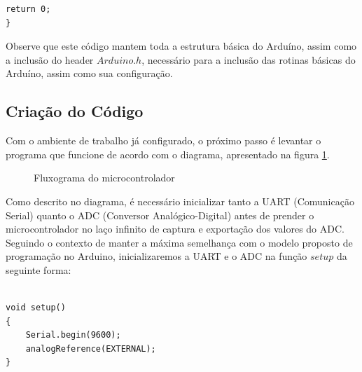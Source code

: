 \begin{multicols}{2}
\begin{lstlisting}[basicstyle=\ttfamily,numbers=none,caption={[Exemplo da função main()]Código de exemplo da função main()}]
	return 0;
}
\end{lstlisting}

Observe que este código mantem toda a estrutura básica do Arduíno, assim como a inclusão do header $Arduino.h$, necessário para a inclusão das rotinas básicas do Arduíno, assim como sua configuração.

\subsection{Criação do Código}\label{making}

Com o ambiente de trabalho já configurado, o próximo passo é levantar o programa que funcione de acordo com o diagrama, apresentado na figura \ref{flux_micro}.

\begin{figure}[H]
\begin{center}
\end{center}
\caption{Fluxograma do microcontrolador}
\label{flux_micro}
\end{figure}

Como descrito no diagrama, é necessário inicializar tanto a UART (Comunicação Serial) quanto o ADC (Conversor Analógico-Digital) antes de prender o microcontrolador no laço infinito de captura e exportação dos valores do ADC. Seguindo o contexto de manter a máxima semelhança com o modelo proposto de programação no Arduino, inicializaremos a UART e o ADC na função $setup$ da seguinte forma:

\begin{lstlisting}[basicstyle=\ttfamily,numbers=none,caption={[setup()]Código da função setup()}]

void setup()
{
	Serial.begin(9600);
	analogReference(EXTERNAL);
}

\end{lstlisting}


\end{multicols}
